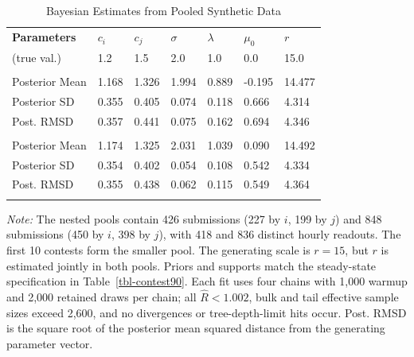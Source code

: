 \documentclass[mnsc]{informs3}
\begin{document}
\begin{table}[!htbp]
\newcommand{\celltext}[1]{\leavevmode#1}
\centering
\caption{Bayesian Estimates from Pooled Synthetic Data}\label{tbl-pool-synthetic-data}
\small
\begin{tabularx}{\textwidth}{lYYYYYY}
\toprule
\textbf{Parameters} & \textbf{$c_i$} & \textbf{$c_j$} & \textbf{$\sigma$} & \textbf{$\lambda$} & \textbf{$\mu_0$} & \textbf{$r$} \\
\addlinespace[0.25ex]
\addlinespace[0.25ex]
(true val.) & 1.2 & 1.5 & 2.0 & 1.0 & 0.0 & 15.0 \\
\midrule
\addlinespace
{} \\
\celltext{Posterior Mean} & 1.168 & 1.326 & 1.994 & 0.889 & -0.195 & 14.477 \\
\celltext{Posterior SD}   & 0.355 & 0.405 & 0.074 & 0.118 & 0.666 & 4.314 \\
\celltext{Post. RMSD}     & 0.357 & 0.441 & 0.075 & 0.162 & 0.694 & 4.346 \\
\addlinespace
{} \\
\celltext{Posterior Mean} & 1.174 & 1.325 & 2.031 & 1.039 & 0.090 & 14.492 \\
\celltext{Posterior SD}   & 0.354 & 0.402 & 0.054 & 0.108 & 0.542 & 4.334 \\
\celltext{Post. RMSD}     & 0.355 & 0.438 & 0.062 & 0.115 & 0.549 & 4.364 \\
\bottomrule
\addlinespace[0.5ex]
\end{tabularx}
\begin{minipage}{\textwidth}
{\footnotesize
\textit{Note:}
The nested pools contain 426 submissions (227 by $i$, 199 by $j$) and 848 submissions (450 by $i$, 398 by $j$), with 418 and 836 distinct hourly readouts. The first 10 contests form the smaller pool. The generating scale is $r=15$, but $r$ is estimated jointly in both pools. Priors and supports match the steady-state specification in Table~\ref{tbl-contest90}. Each fit uses four chains with 1,000 warmup and 2,000 retained draws per chain; all $\widehat R<1.002$, bulk and tail effective sample sizes exceed 2,600, and no divergences or tree-depth-limit hits occur. {Post. RMSD is the square root of the posterior mean squared distance from the generating parameter vector.}
}
\end{minipage}
\end{table}
\end{document}
